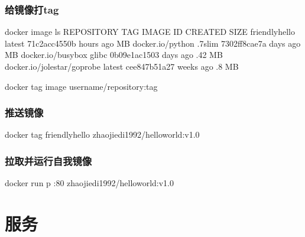 \documentclass[letterpaper,10pt,english]{sphinxmanual}
\begin{document}
\subsection{给镜像打tag}
\label{\detokenize{_u5feb_u901f_u5165_u95e8/02-_u5bb9_u5668:tag}}
%
\begin{sphinxVerbatim}[commandchars=\\\{\}]
docker image ls
    REPOSITORY                    TAG                 IMAGE ID            CREATED             SIZE
    friendlyhello                 latest              71c2acc4550b         hours ago          MB
    docker.io/python              .7\PYGZhy{}slim            7302ff8cae7a         days ago           MB
    docker.io/busybox             glibc               0b09e1ac1503         days ago         .42 MB
    docker.io/jolestar/go\PYGZhy{}probe   latest              cee847b51a27         weeks ago         .8 MB

docker tag image username/repository:tag
\end{sphinxVerbatim}


\subsection{推送镜像}
\label{\detokenize{_u5feb_u901f_u5165_u95e8/02-_u5bb9_u5668:id8}}
%
\begin{sphinxVerbatim}[commandchars=\\\{\}]
docker tag friendlyhello zhaojiedi1992/helloworld:v1.0
\end{sphinxVerbatim}


\subsection{拉取并运行自我镜像}
\label{\detokenize{_u5feb_u901f_u5165_u95e8/02-_u5bb9_u5668:id9}}
%
\begin{sphinxVerbatim}[commandchars=\\\{\}]
docker run \PYGZhy{}p :80 zhaojiedi1992/helloworld:v1.0
\end{sphinxVerbatim}


\chapter{服务}
\label{\detokenize{_u5feb_u901f_u5165_u95e8/03-_u670d_u52a1::doc}}\label{\detokenize{_u5feb_u901f_u5165_u95e8/03-_u670d_u52a1:id1}}
\end{document}
